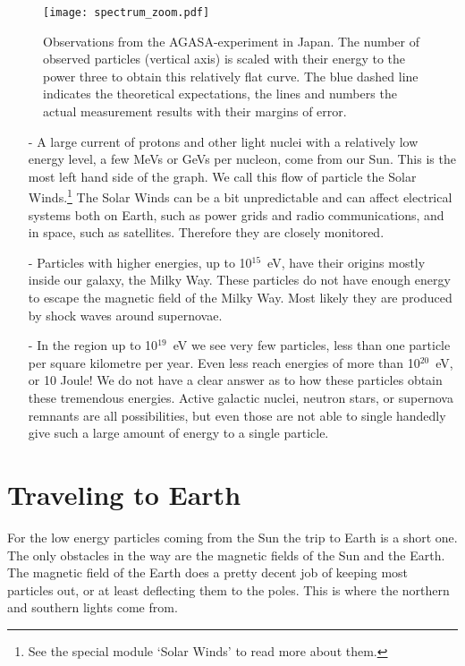 \begin{figure}\begin{center}
\texttt{[image: spectrum\_zoom.pdf]}
\caption{Observations from the AGASA-experiment in Japan. The number of observed particles (vertical axis) is scaled with their energy to the power three to obtain this relatively flat curve. The blue dashed line indicates the theoretical expectations, the lines and numbers the actual measurement results with their margins of error.}\label{fig:spectrum_zoom}
\end{center}\end{figure}

\begin{itemize}
\item[-] A large current of protons and other light nuclei with a relatively low energy level, a few MeVs or GeVs per nucleon, come from our Sun. This is the most left hand side of the graph. We call this flow of particle the Solar Winds.\footnote{See the special module `Solar Winds' to read more about them.} The Solar Winds can be a bit unpredictable and can affect electrical systems both on Earth, such as power grids and radio communications, and in space, such as satellites. Therefore they are closely monitored. 
\item[-] Particles with higher energies, up to 10$^{15}$~eV, have their origins mostly inside our galaxy, the Milky Way. These particles do not have enough energy to escape the magnetic field of the Milky Way. Most likely they are produced by shock waves around supernovae.
\item[-] In the region up to 10$^{19}$~eV we see very few particles, less than one particle per square kilometre per year. Even less reach energies of more than 10$^{20}$~eV, or 10 Joule! We do not have a clear answer as to how these particles obtain these tremendous energies. Active galactic nuclei, neutron stars, or supernova remnants are all possibilities, but even those are not able to single handedly give such a large amount of energy to a single particle.
\end{itemize}

\section{Traveling to Earth}
For the low energy particles coming from the Sun the trip to Earth is a short one. The only obstacles in the way are the magnetic fields of the Sun and the Earth. The magnetic field of the Earth does a pretty decent job of keeping most particles out, or at least deflecting them to the poles. This is where the northern and southern lights come from.

